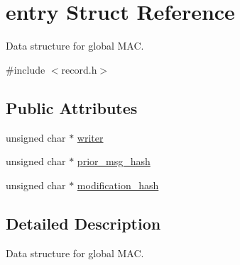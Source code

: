 \hypertarget{structentry}{\section{entry Struct Reference}
\label{structentry}
}


Data structure for global M\-A\-C.  




{\ttfamily \#include $<$record.\-h$>$}

\subsection*{Public Attributes}
\begin{DoxyCompactItemize}
\item 
unsigned char $\ast$ \hyperlink{structentry_a4ac72e6020ac86e54e70eace46b2e5e1}{writer}
\item 
unsigned char $\ast$ \hyperlink{structentry_af3b4c9711b96f7e55c1f7a1be7944a4d}{prior\-\_\-msg\-\_\-hash}
\item 
unsigned char $\ast$ \hyperlink{structentry_a7a158f7cc0a3488a06d3d7510bf9234d}{modification\-\_\-hash}
\end{DoxyCompactItemize}


\subsection{Detailed Description}
Data structure for global M\-A\-C. 

